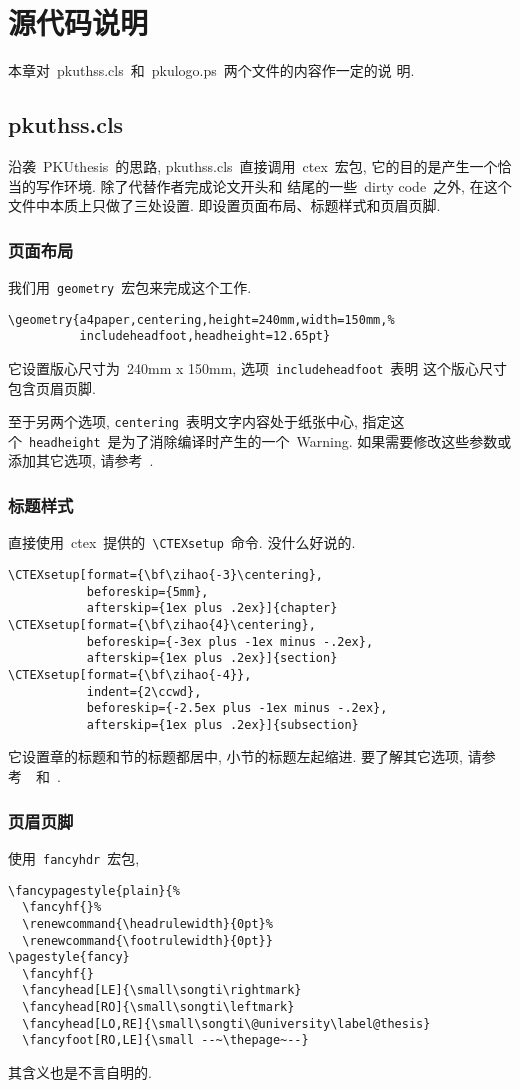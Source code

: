 \chapter{源代码说明}

本章对~pkuthss.cls~和~pkulogo.ps~两个文件的内容作一定的说
明.

\section{pkuthss.cls}

沿袭~PKUthesis~的思路, pkuthss.cls~直接调用~ctex~宏包,
它的目的是产生一个恰当的写作环境. 除了代替作者完成论文开头和
结尾的一些~dirty code~之外, 在这个文件中本质上只做了三处设置.
即设置页面布局、标题样式和页眉页脚.

\subsection{页面布局}
我们用~\verb|geometry|~宏包来完成这个工作.
\begin{verbatim}
\geometry{a4paper,centering,height=240mm,width=150mm,%
          includeheadfoot,headheight=12.65pt}
\end{verbatim}
它设置版心尺寸为~240mm x 150mm, 选项~\verb|includeheadfoot|~表明
这个版心尺寸包含页眉页脚.

至于另两个选项, \verb|centering|~表明文字内容处于纸张中心,
指定这个~\verb|headheight|~是为了消除编译时产生的一个~Warning.
如果需要修改这些参数或添加其它选项, 请参考~\cite{geometry}.

\subsection{标题样式}
直接使用~ctex~提供的~\verb|\CTEXsetup|~命令. 没什么好说的.
\begin{verbatim}
\CTEXsetup[format={\bf\zihao{-3}\centering},
           beforeskip={5mm},
           afterskip={1ex plus .2ex}]{chapter}
\CTEXsetup[format={\bf\zihao{4}\centering},
           beforeskip={-3ex plus -1ex minus -.2ex},
           afterskip={1ex plus .2ex}]{section}
\CTEXsetup[format={\bf\zihao{-4}},
           indent={2\ccwd},
           beforeskip={-2.5ex plus -1ex minus -.2ex},
           afterskip={1ex plus .2ex}]{subsection}
\end{verbatim}
它设置章的标题和节的标题都居中, 小节的标题左起缩进.
要了解其它选项, 请参考~\cite{ctex}~和~\cite{ctexfaq}.

\subsection{页眉页脚}
使用~\verb|fancyhdr|~宏包,
\begin{verbatim}
\fancypagestyle{plain}{%
  \fancyhf{}%
  \renewcommand{\headrulewidth}{0pt}%
  \renewcommand{\footrulewidth}{0pt}}
\pagestyle{fancy}
  \fancyhf{}
  \fancyhead[LE]{\small\songti\rightmark}
  \fancyhead[RO]{\small\songti\leftmark}
  \fancyhead[LO,RE]{\small\songti\@university\label@thesis}
  \fancyfoot[RO,LE]{\small --~\thepage~--}
\end{verbatim}
其含义也是不言自明的.


